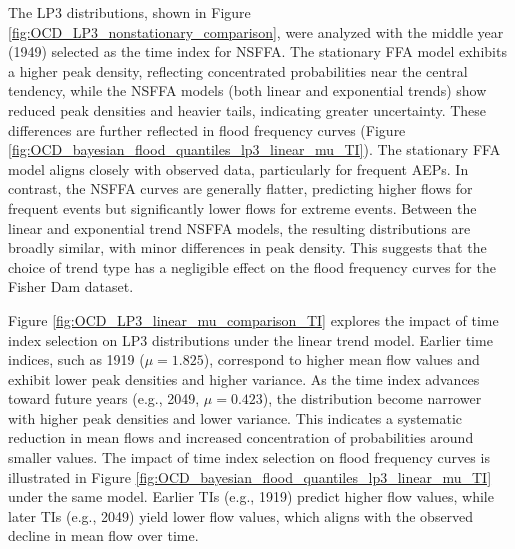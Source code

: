 The LP3 distributions, shown in Figure \ref{fig:OCD_LP3_nonstationary_comparison}, were analyzed with the middle year (1949) selected as the time index for NSFFA. The stationary FFA model exhibits a higher peak density, reflecting concentrated probabilities near the central tendency, while the NSFFA models (both linear and exponential trends) show reduced peak densities and heavier tails, indicating greater uncertainty. These differences are further reflected in flood frequency curves (Figure \ref{fig:OCD_bayesian_flood_quantiles_lp3_linear_mu_TI}). The stationary FFA model aligns closely with observed data, particularly for frequent AEPs. In contrast, the NSFFA curves are generally flatter, predicting higher flows for frequent events but significantly lower flows for extreme events. Between the linear and exponential trend NSFFA models, the resulting distributions are broadly similar, with minor differences in peak density. This suggests that the choice of trend type has a negligible effect on the flood frequency curves for the Fisher Dam dataset.

Figure \ref{fig:OCD_LP3_linear_mu_comparison_TI} explores the impact of time index selection on LP3 distributions under the linear trend model. Earlier time indices, such as 1919 ($\mu = 1.825$), correspond to higher mean flow values and exhibit lower peak densities and higher variance. As the time index advances toward future years (e.g., 2049, $\mu = 0.423$), the distribution become narrower with higher peak densities and lower variance. This indicates a systematic reduction in mean flows and increased concentration of probabilities around smaller values. The impact of time index selection on flood frequency curves is illustrated in Figure \ref{fig:OCD_bayesian_flood_quantiles_lp3_linear_mu_TI} under the same model. Earlier TIs (e.g., 1919) predict higher flow values, while later TIs (e.g., 2049) yield lower flow values, which aligns with the observed decline in mean flow over time.

